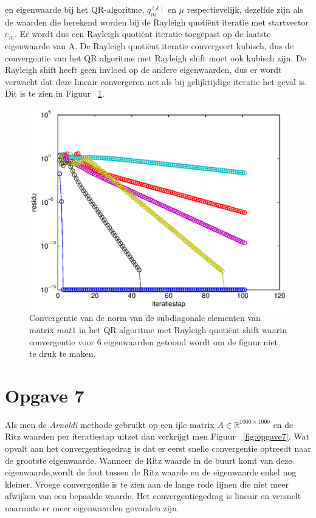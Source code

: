 \documentclass[a4paper]{article}
\newcommand{\opgave}[1]{\section*{Opgave #1}}
\begin{document}
en eigenwaarde bij het QR-algoritme, $q_m^{(k)}$ en $\mu$ respectievelijk, dezelfde zijn als de waarden
die berekend worden bij de Rayleigh quoti\"{e}nt iteratie met startvector $e_m$. Er wordt dus een Rayleigh quoti\"{e}nt iteratie toegepast op de laatste eigenwaarde van
A. De Rayleigh quoti\"{e}nt iteratie convergeert kubisch, dus de convergentie van het QR algoritme met Rayleigh shift moet ook kubisch zijn. De Rayleigh shift heeft geen invloed op de andere eigenwaarden, dus er wordt verwacht dat deze lineair convergeren net als bij gelijktijdige iteratie het geval is. Dit is te zien in Figuur ~\ref{fig:opgave6}.
\begin{figure}
\centerline{\includegraphics{pictures/opgave6Beter.eps}}
\caption{Convergentie van de norm van de subdiagonale elementen van matrix $mat1$ in het QR algoritme met Rayleigh quoti\"{e}nt shift waarin convergentie voor 6 eigenwaarden getoond wordt om de figuur niet te druk te maken.}
\label{fig:opgave6}
\end{figure}
\opgave{7}
Als men de \textit{Arnoldi} methode gebruikt op een ijle matrix $A \in \mathbb{R}^{1000\times1000}$ en de Ritz waarden per iteratiestap uitzet dan verkrijgt men Figuur ~\ref{fig:opgave7}.
Wat opvalt aan het convergentiegedrag is dat er eerst snelle convergentie optreedt naar de grootste eigenwaarde. Wanneer de Ritz waarde in de buurt komt van deze eigenwaarde,wordt de fout tussen de Ritz waarde en de eigenwaarde enkel nog kleiner. Vroege convergentie is te zien aan de lange rode lijnen die niet meer afwijken van een bepaalde waarde. Het convergentiegedrag is lineair en versnelt naarmate er meer eigenwaarden gevonden zijn.
\end{document}
